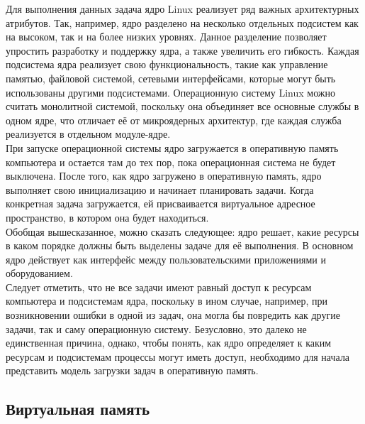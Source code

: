 Для выполнения данных задача ядро Linux реализует ряд важных архитектурных атрибутов.
Так, например, ядро разделено на несколько отдельных подсистем как на высоком, так и на более низких уровнях.
Данное разделение позволяет упростить разработку и поддержку ядра, а также увеличить его гибкость.
Каждая подсистема ядра реализует свою функциональность, такие как управление памятью, файловой системой, сетевыми интерфейсами, которые могут быть использованы другими подсистемами.
Операционную систему Linux можно считать монолитной системой, поскольку она объединяет все основные службы в одном ядре, что отличает её от микроядерных архитектур, где каждая служба реализуется в отдельном модуле-ядре.\\
При запуске операционной системы ядро загружается в оперативную память компьютера и остается там до тех пор, пока операционная система не будет выключена.
После того, как ядро загружено в оперативную память, ядро выполняет свою инициализацию и начинает планировать задачи.
Когда конкретная задача загружается, ей присваивается виртуальное адресное пространство, в котором она будет находиться.\vspace{0.5cm}\\
\indent Обобщая вышесказанное, можно сказать следующее: ядро решает, какие ресурсы в каком порядке должны быть выделены задаче для её выполнения.
В основном ядро действует как интерфейс между пользовательскими приложениями и оборудованием.\\
Следует отметить, что не все задачи имеют равный доступ к ресурсам компьютера и подсистемам ядра, поскольку в ином случае, например, при возникновении ошибки в одной из задач, она могла бы повредить как другие задачи, так и саму операционную систему.
Безусловно, это далеко не единственная причина, однако, чтобы понять, как ядро определяет к каким ресурсам и подсистемам процессы могут иметь доступ, необходимо для начала представить модель загрузки задач в оперативную память.

\subsection{Виртуальная память}\label{subsec:-}

